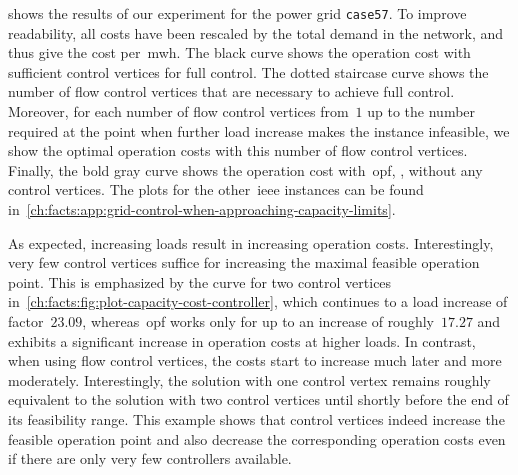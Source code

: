  shows the results of our
experiment for the power grid \texttt{case57}. To improve readability, all costs
have been rescaled by the total demand in the network, and thus give the cost
per~\gls{mwh}. The black curve shows the operation cost with sufficient
control vertices for full control. The dotted staircase curve shows the number
of flow control vertices that are necessary to achieve full control. Moreover,
for each number of flow control vertices from~$1$ up to the number required at
the point when further load increase makes the instance infeasible, we show the
optimal operation costs with this number of flow control vertices. Finally, the
bold gray curve shows the operation cost with~\gls{opf}, \ie, without any
control vertices. The plots for the other~\gls{ieee} instances %
can be found in~\cref{ch:facts:app:grid-control-when-approaching-capacity-limits}.

As expected, increasing loads result in increasing operation costs.
Interestingly, very few control vertices suffice for increasing the maximal
feasible operation point. This is emphasized by the curve for two control
vertices in~\cref{ch:facts:fig:plot-capacity-cost-controller}, which continues
to a load increase of factor~$23.09$, whereas~\gls{opf} works only for up
to an increase of roughly~$17.27$ and exhibits a significant increase in
operation costs at higher loads. In contrast, when using flow control vertices,
the costs start to increase much later and more moderately. Interestingly, the
solution with one control vertex remains roughly equivalent to the solution with
two control vertices until shortly before the end of its feasibility range. This
example shows that control vertices indeed increase the feasible operation point
and also decrease the corresponding operation costs even if there are only very
few controllers available.
% 
